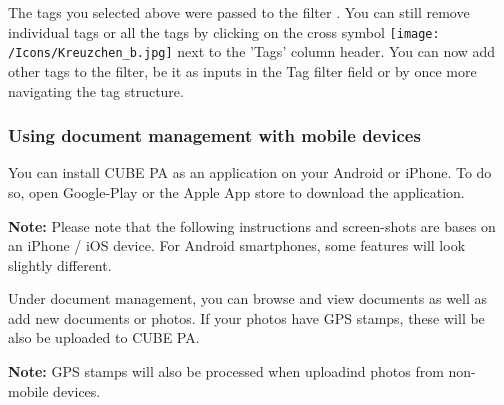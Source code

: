 The tags you selected above were passed to the filter . You can still remove individual tags or all the tags by clicking on the cross symbol \texttt{[image: /Icons/Kreuzchen\_b.jpg]} next to the 'Tags' column header. You can now add other tags to the filter, be it as inputs in the Tag filter field or by once more navigating the tag structure.

\vspace{\baselineskip}

\subsubsection{Using document management with mobile devices}

You can install CUBE PA as an application on your Android or iPhone. To do so, open Google-Play or the Apple App store to download the application.

\vspace{\baselineskip}

\textbf{Note:} Please note that the following instructions and screen-shots are bases on an iPhone / iOS device. For Android smartphones, some features will look slightly different.

\vspace{\baselineskip}

Under document management, you can browse and view documents as well as add new documents or photos. If your photos have GPS stamps, these will be also be uploaded to CUBE PA.

\vspace{\baselineskip}

\textbf{Note:} GPS stamps will also be processed when uploadind photos from non-mobile devices.

\vspace{\baselineskip}

